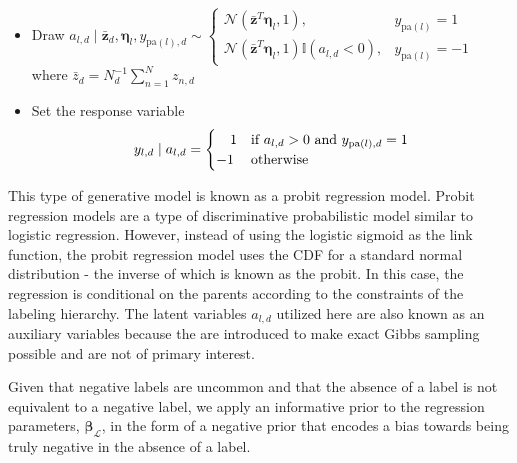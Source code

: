 \begin{enumerate}
\begin{itemize}
\begin{itemize}
\item Draw $a_{l,d}\mid \bar{\mathbf{z}}_d,\boldsymbol\eta_{l},y_{\mathrm{pa}(l),d}\sim\begin{cases}
\mathcal{N}(\bar{\mathbf{z}}^{T}\boldsymbol\eta_{l},1), & y_{\mathrm{pa}(l)}=1\\
\mathcal{N}(\bar{\mathbf{z}}^{T}\boldsymbol\eta_{l},1)\mathbb{I}(a_{l,d}<0), & y_{\mathrm{pa}(l)}=-1\end{cases}$ \\where $\bar{z}_{d}=N_{d}^{-1}\sum_{n=1}^{N}z_{n,d}$ %
 
\item Set the response variable \[
y_{l,d}\mid a_{l,d}=\begin{cases}
\ \ \ 1 & \text{if \ensuremath{a_{l,d}>0} and \ensuremath{y_{{\rm \mathrm{pa}}(l),d}=1}}\\
-1 & \text{otherwise}\end{cases}\]
 
\end{itemize}
\end{itemize}
\end{enumerate}
This type of generative model is known as a probit regression model.
Probit regression models are a type of discriminative probabilistic
model similar to logistic regression. However, instead of using the
logistic sigmoid as the link function, the probit regression model
uses the CDF for a standard normal distribution - the inverse of which
is known as the probit. In this case, the regression is conditional
on the parents according to the constraints of the labeling hierarchy.
The latent variables $a_{l,d}$ utilized here are also known as an
auxiliary variables because the are introduced to make exact Gibbs
sampling possible and are not of primary interest.

Given that negative labels are uncommon and that the absence of a
label is not equivalent to a negative label, we apply an informative
prior to the regression parameters, $\mathbf{\boldsymbol\beta}_{\mathcal{L}}$,
in the form of a negative prior that encodes a bias towards being
truly negative in the absence of a label.

